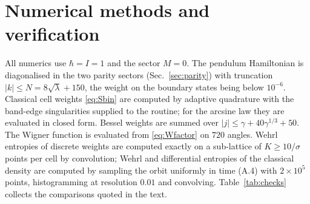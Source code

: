 \documentclass[preprint,12pt]{elsarticle}
\begin{document}
\section{Numerical methods and verification}
\label{app:num}

All numerics use $\hbar=I=1$ and the sector $M=0$. The pendulum Hamiltonian is
diagonalised in the two parity sectors (Sec.~\ref{sec:parity}) with truncation
$|k|\le N=8\sqrt{\lambda}+150$, the weight on the boundary states being below
$10^{-6}$. Classical cell weights \eqref{eq:Sbin} are computed by adaptive
quadrature with the band-edge singularities supplied to the routine; for the
arcsine law they are evaluated in closed form. Bessel weights are summed over
$|j|\le\gamma+40\gamma^{1/3}+50$. The Wigner function is evaluated from
\eqref{eq:Wfactor} on $720$ angles. Wehrl entropies of discrete weights are
computed exactly on a sub-lattice of $K\ge10/\sigma$ points per cell by
convolution; Wehrl and differential entropies of the classical density are
computed by sampling the orbit uniformly in time (A.4) with $2\times10^{5}$
points, histogramming at resolution $0.01$ and convolving. Table~\ref{tab:checks}
collects the comparisons quoted in the text.
\end{document}
